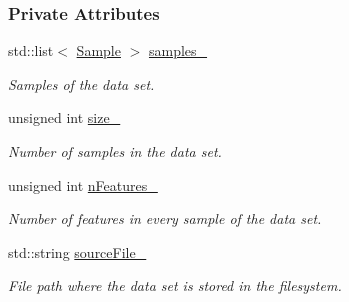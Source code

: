 \subsubsection*{Private Attributes}
\begin{CompactItemize}
\item 
\hypertarget{class_data_set_cfb8c9d22aa3d295e37ef7d820c9c33e}{
std::list$<$ \hyperlink{class_data_set_7563096ce4847d88411ed3f6ad331310}{Sample} $>$ \hyperlink{class_data_set_cfb8c9d22aa3d295e37ef7d820c9c33e}{samples\_\-}}
\label{class_data_set_cfb8c9d22aa3d295e37ef7d820c9c33e}

\begin{CompactList}\small\item\em Samples of the data set. \item\end{CompactList}\item 
\hypertarget{class_data_set_b25b58d12a1f41ec758471bb663c8fa5}{
unsigned int \hyperlink{class_data_set_b25b58d12a1f41ec758471bb663c8fa5}{size\_\-}}
\label{class_data_set_b25b58d12a1f41ec758471bb663c8fa5}

\begin{CompactList}\small\item\em Number of samples in the data set. \item\end{CompactList}\item 
\hypertarget{class_data_set_5b263b90a7055808071f1c46e95b9b5c}{
unsigned int \hyperlink{class_data_set_5b263b90a7055808071f1c46e95b9b5c}{nFeatures\_\-}}
\label{class_data_set_5b263b90a7055808071f1c46e95b9b5c}

\begin{CompactList}\small\item\em Number of features in every sample of the data set. \item\end{CompactList}\item 
\hypertarget{class_data_set_f0e886e32a0ec23046e6e58813a3c69b}{
std::string \hyperlink{class_data_set_f0e886e32a0ec23046e6e58813a3c69b}{sourceFile\_\-}}
\label{class_data_set_f0e886e32a0ec23046e6e58813a3c69b}

\begin{CompactList}\small\item\em File path where the data set is stored in the filesystem. \item\end{CompactList}\end{CompactItemize}


